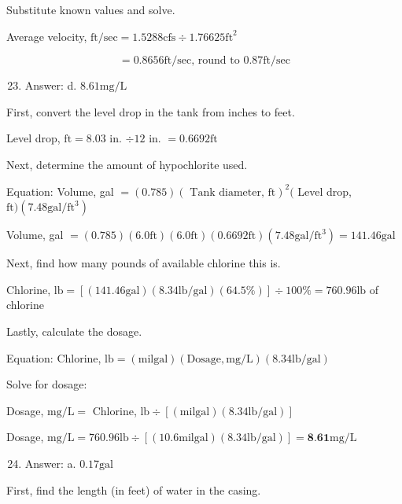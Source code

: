 \documentclass[10pt]{article}
\begin{document}
Substitute known values and solve.

Average velocity, $\mathrm{ft} / \mathrm{sec}=1.5288 \mathrm{cfs} \div 1.76625 \mathrm{ft}^{2}$

$$
=0.8656 \mathrm{ft} / \mathrm{sec} \text {, round to } 0.87 \mathrm{ft} / \mathrm{sec}
$$

\begin{enumerate}
  \setcounter{enumi}{22}
  \item Answer: d. $8.61 \mathrm{mg} / \mathrm{L}$
\end{enumerate}

First, convert the level drop in the tank from inches to feet.

Level drop, $\mathrm{ft}=8.03$ in. $\div 12$ in. $=0.6692 \mathrm{ft}$

Next, determine the amount of hypochlorite used.

Equation: Volume, gal $=(0.785)(\text { Tank diameter, } \mathrm{ft})^{2}($ Level drop, $\mathrm{ft})\left(7.48 \mathrm{gal} / \mathrm{ft}^{3}\right)$

Volume, gal $=(0.785)(6.0 \mathrm{ft})(6.0 \mathrm{ft})(0.6692 \mathrm{ft})\left(7.48 \mathrm{gal} / \mathrm{ft}^{3}\right)=141.46 \mathrm{gal}$

Next, find how many pounds of available chlorine this is.

Chlorine, $\mathrm{lb}=[(141.46 \mathrm{gal})(8.34 \mathrm{lb} / \mathrm{gal})(64.5 \%)] \div 100 \%=760.96 \mathrm{lb}$ of chlorine

Lastly, calculate the dosage.

Equation: Chlorine, $\mathrm{lb}=(\mathrm{mil} \mathrm{gal})(\mathrm{Dosage}, \mathrm{mg} / \mathrm{L})(8.34 \mathrm{lb} / \mathrm{gal})$

Solve for dosage:

Dosage, $\mathrm{mg} / \mathrm{L}=$ Chlorine, $\mathrm{lb} \div[(\mathrm{mil} \mathrm{gal})(8.34 \mathrm{lb} / \mathrm{gal})]$

Dosage, $\mathrm{mg} / \mathrm{L}=760.96 \mathrm{lb} \div[(10.6 \mathrm{mil} \mathrm{gal})(8.34 \mathrm{lb} / \mathrm{gal})]=\mathbf{8 . 6 1} \mathrm{mg} / \mathrm{L}$

\begin{enumerate}
  \setcounter{enumi}{23}
  \item Answer: a. $0.17 \mathrm{gal}$
\end{enumerate}

First, find the length (in feet) of water in the casing.
\end{document}
